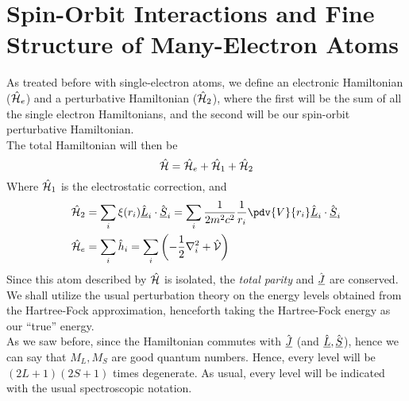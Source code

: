 \documentclass[../qm.tex]{subfiles}
\begin{document}
	\section{Spin-Orbit Interactions and Fine Structure of Many-Electron Atoms}
	As treated before with single-electron atoms, we define an electronic Hamiltonian ($\hat{\mathcal{H}}_e$) and a perturbative Hamiltonian ($\hat{\mathcal{H}}_2$), where the first will be the sum of all the single electron Hamiltonians, and the second will be our spin-orbit perturbative Hamiltonian.\\
	The total Hamiltonian will then be
	\begin{equation}
		\hat{\mathcal{H}}=\hat{\mathcal{H}}_e+\hat{\mathcal{H}}_1+\hat{\mathcal{H}}_2
		\label{eq:socouplingmanyelec}
	\end{equation}
	Where $\hat{\mathcal{H}}_1$ is the electrostatic correction, and
	\begin{equation}
		\begin{aligned}
			\opr{\ham}_2&=\sum_i\xi(r_i)\vecopr{L}_i\cdot\vecopr{S}_i=\sum_i\frac{1}{2m^2c^2}\frac{1}{r_i}\pdv{V}{r_i}\vecopr{L}_i\cdot\vecopr{S}_i\\
			\opr{\ham}_e&=\sum_i\opr{h}_i=\sum_i\left( -\frac{1}{2}\nabla_i^2+\opr{\mathcal{V}} \right)
		\end{aligned}
		\label{eq:definitionssomultielec}
	\end{equation}
	Since this atom described by $\hat{\mathcal{H}}$ is isolated, the \textit{total parity} and $\hat{\underline{J}}$ are conserved.\\
	We shall utilize the usual perturbation theory on the energy levels obtained from the Hartree-Fock approximation, henceforth taking the Hartree-Fock energy as our ``true'' energy.\\
	As we saw before, since the Hamiltonian commutes with $\hat{\underline{J}}$ (and $\hat{\underline{L}},\hat{\underline{S}}$), hence we can say that $M_L,M_S$ are good quantum numbers. Hence, every level will be $(2L+1)(2S+1)$ times degenerate. As usual, every level will be indicated with the usual spectroscopic notation.
\end{document}
